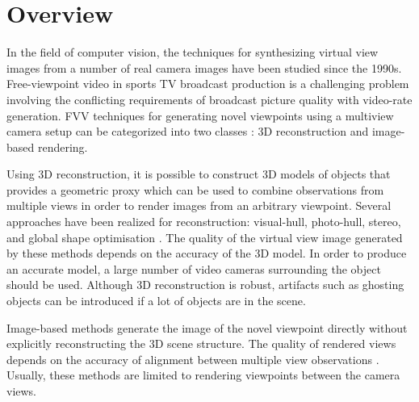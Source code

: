 
\section{Overview}
In the field of computer vision, the techniques for synthesizing virtual view images from a number of real camera
images have been studied since the 1990s.
Free-viewpoint video in sports TV broadcast production is a challenging problem involving the conflicting requirements of 
broadcast picture quality with video-rate generation.
FVV techniques for generating novel viewpoints using a multiview camera setup can be categorized into two classes 
\cite{05_plane_sweeping}: 3D reconstruction and image-based rendering. 

Using 3D reconstruction, it is possible to construct 3D models of objects that provides a geometric proxy which can be
used to combine observations from multiple views in order to render images from an arbitrary viewpoint. 
Several approaches have been realized for reconstruction: visual-hull, photo-hull, stereo, and 
global shape optimisation \cite{02_iview}.
The quality of the virtual view image generated
by these methods depends on the accuracy of the 3D model. In order to produce an accurate model, a
large number of video cameras surrounding the object should be used. 
Although 3D reconstruction is robust, artifacts such as ghosting objects can be introduced if a lot of objects are in the scene. 

Image-based methods generate the image of the novel viewpoint directly without explicitly reconstructing the 3D scene structure.
The quality of rendered views depends on the accuracy of alignment between multiple view observations 
\cite{05_plane_sweeping,02_iview}.
Usually, these methods are limited to rendering viewpoints between the camera views.




